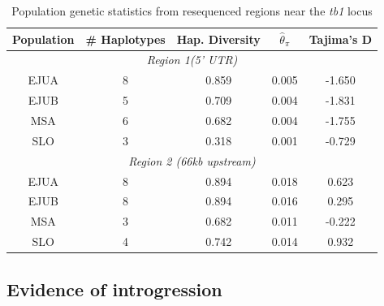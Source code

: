 \documentclass[11pt]{article}
\begin{document}
\begin{linenumbers}
\begin{flushleft}
\begin{table}[htbp]
  \centering
  \caption{Population genetic statistics from resequenced regions near the \emph{tb1} locus}
    \begin{tabular}{ccccc}\\\toprule
    \textbf{Population} & \# \textbf{Haplotypes} & \textbf{Hap. Diversity} & \textbf{$\hat\theta_\pi$}    & \textbf{Tajima's D} \\\midrule
    \multicolumn{5}{c}{\textit{Region 1(5' UTR)}} \\
    \multicolumn{1}{c}{EJUA} & 8     & 0.859 & 0.005 & -1.650 \\
    \multicolumn{1}{c}{EJUB} & 5     & 0.709 & 0.004 & -1.831 \\
    \multicolumn{1}{c}{MSA} & 6     & 0.682 & 0.004 & -1.755 \\
    \multicolumn{1}{c}{SLO} & 3     & 0.318 & 0.001 & -0.729 \\
    \multicolumn{5}{c}{\textit{Region 2 (66kb upstream)}} \\
    \multicolumn{1}{c}{EJUA} & 8     & 0.894 & 0.018 & 0.623 \\
    \multicolumn{1}{c}{EJUB} & 8     & 0.894 & 0.016 & 0.295 \\
    \multicolumn{1}{c}{MSA} & 3     & 0.682 & 0.011 & -0.222 \\
    \multicolumn{1}{c}{SLO} & 4     & 0.742 & 0.014 & 0.932 \\\bottomrule
    \end{tabular}
  \label{Table2Diversity}
\end{table}

\subsection*{Evidence of introgression}


\end{flushleft}
\end{linenumbers}
\end{document}
